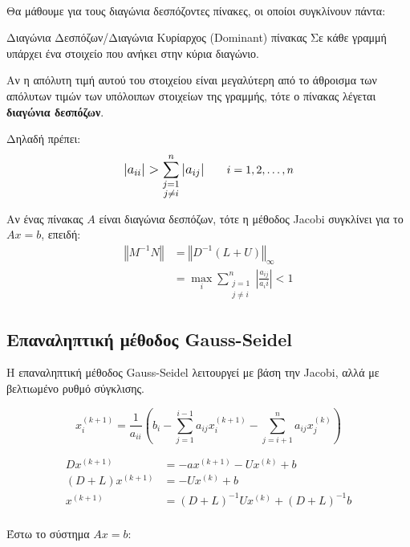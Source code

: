 \documentclass[11pt,a4paper,notitlepage,fleqn,final]{article}
\begin{document}
\paragraph{}
Θα μάθουμε για τους διαγώνια δεσπόζοντες πίνακες, οι οποίοι
συγκλίνουν πάντα:
\begin{defn}{Διαγώνια Δεσπόζων/Διαγώνια Κυρίαρχος (Dominant) πίνακας}{}
	Σε κάθε γραμμή υπάρχει ένα στοιχείο που ανήκει στην κύρια διαγώνιο.

	Αν η απόλυτη τιμή αυτού του στοιχείου είναι μεγαλύτερη από
    το άθροισμα των απόλυτων τιμών των υπόλοιπων στοιχείων της γραμμής,
    τότε ο πίνακας λέγεται \textbf{διαγώνια δεσπόζων}.

    Δηλαδή πρέπει:
    \[
    \mathlarger{
        \left|a_{ii}\right| > \sum_{\substack{j=1\\j\neq i}}^{n}
        \left|a_{ij}\right|
}   \qquad i=1,2,\dots,n
    \]
\end{defn}

Αν ένας πίνακας \( A \) είναι διαγώνια δεσπόζων, τότε η μέθοδος Jacobi
συγκλίνει για το \( Ax = b \), επειδή:
\begin{align*}
	\left\Vert M^{-1}N \right\Vert &=
	\left\Vert D^{-1} (L+U) \right\Vert_{\infty} \\
	&= \max_i \sum_{\substack{j=1\\j\neq i}}^{n}
	 \left|\frac{a_{ij}}{a_ii}\right| < 1
\end{align*}

\subsection{Επαναληπτική μέθοδος Gauss-Seidel}
Η επαναληπτική μέθοδος Gauss-Seidel λειτουργεί με βάση την Jacobi, αλλά
με βελτιωμένο ρυθμό σύγκλισης.

\[
x_i^{(k+1)} = \frac{1}{a_{ii}}\left(
b_i - \sum_{j=1}^{i-1}a_{ij}x_i^{(k+1)}
- \sum_{j=i+1}^{n} a_{ij}x_j^{(k)}
\right)
\]

\begin{align*}
	Dx^{(k+1)} &= -ax^{(k+1)} - Ux^{(k)}+b \\
	(D+L)x^{(k+1)} &= -Ux^{(k)}+b \\
	x^{(k+1)} &= (D+L)^{-1}Ux^{(k)}+(D+L)^{-1}b
\end{align*}

\paragraph{}
Έστω το σύστημα \( Ax=b \):
\end{document}

